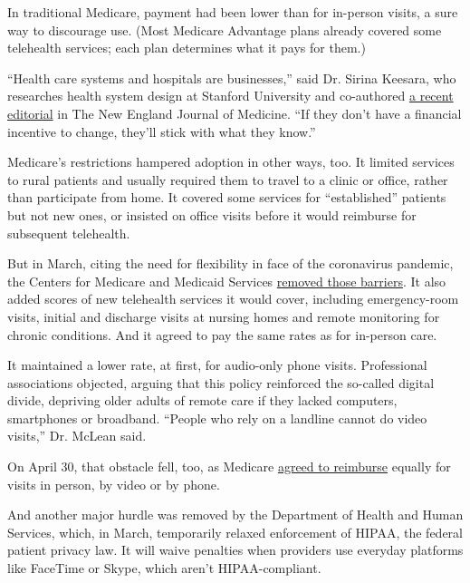In traditional Medicare, payment had been lower than for in-person
visits, a sure way to discourage use. (Most Medicare Advantage plans
already covered some telehealth services; each plan determines what it
pays for them.)

``Health care systems and hospitals are businesses,'' said Dr. Sirina
Keesara, who researches health system design at Stanford University and
co-authored \href{https://www.nejm.org/doi/full/10.1056/NEJMp2005835}{a
recent editorial} in The New England Journal of Medicine. ``If they
don't have a financial incentive to change, they'll stick with what they
know.''

Medicare's restrictions hampered adoption in other ways, too. It limited
services to rural patients and usually required them to travel to a
clinic or office, rather than participate from home. It covered some
services for ``established'' patients but not new ones, or insisted on
office visits before it would reimburse for subsequent telehealth.

But in March, citing the need for flexibility in face of the coronavirus
pandemic, the Centers for Medicare and Medicaid Services
\href{https://www.cms.gov/newsroom/fact-sheets/additional-backgroundsweeping-regulatory-changes-help-us-healthcare-system-address-covid-19-patient}{removed
those barriers}. It also added scores of new telehealth services it
would cover, including emergency-room visits, initial and discharge
visits at nursing homes and remote monitoring for chronic conditions.
And it agreed to pay the same rates as for in-person care.

It maintained a lower rate, at first, for audio-only phone visits.
Professional associations objected, arguing that this policy reinforced
the so-called digital divide, depriving older adults of remote care if
they lacked computers, smartphones or broadband. ``People who rely on a
landline cannot do video visits,'' Dr. McLean said.

On April 30, that obstacle fell, too, as Medicare
\href{https://www.cms.gov/newsroom/press-releases/trump-administration-issues-second-round-sweeping-changes-support-us-healthcare-system-during-covid}{agreed
to reimburse} equally for visits in person, by video or by phone.

And another major hurdle was removed by the Department of Health and
Human Services, which, in March, temporarily relaxed enforcement of
HIPAA, the federal patient privacy law. It will waive penalties when
providers use everyday platforms like FaceTime or Skype, which aren't
HIPAA-compliant.

